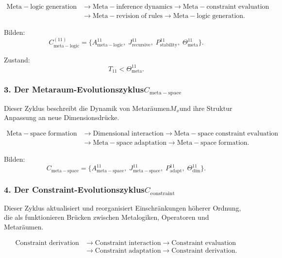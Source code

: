 \[
  \begin{aligned}
  \mathrm{Meta\!-\!logic\;generation}
  &\to \mathrm{Meta\!-\!inference\;dynamics}
  \to \mathrm{Meta\!-\!constraint\;evaluation}\\
  &\to \mathrm{Meta\!-\!revision\;of\;rules}
  \to \mathrm{Meta\!-\!logic\;generation}.
  \end{aligned}
\]

Bilden:
\[
  C_{\mathrm{meta\!-\!logic}}^{(11)}
  =
  \{
    A^{11}_{\mathrm{meta\!-\!logic}},\;
    J^{11}_{\mathrm{recursive}},\;
    P^{11}_{\mathrm{stability}},\;
    \Theta^{11}_{\mathrm{meta}}
  \}.
\]

Zustand:
\[
  T_{11}<\Theta^{11}_{\mathrm{meta}}.
\]


\subsubsection{3. Der Metaraum-Evolutionszyklus$C_{\mathrm{meta\!-\!space}}$}

Dieser Zyklus beschreibt die Dynamik von Metaräumen$M_x$und ihre Struktur
Anpassung an neue Dimensionsdrücke.

\[
  \begin{aligned}
  \mathrm{Meta\!-\!space\;formation}
  &\to \mathrm{Dimensional\;interaction}
  \to \mathrm{Meta\!-\!space\;constraint\;evaluation}\\
  &\to \mathrm{Meta\!-\!space\;adaptation}
  \to \mathrm{Meta\!-\!space\;formation}.
  \end{aligned}
\]

Bilden:
\[
  C_{\mathrm{meta\!-\!space}}
  =
  \{
    A^{11}_{\mathrm{meta\!-\!space}},\;
    J^{11}_{\mathrm{meta\!-\!space}},\;
    P^{11}_{\mathrm{adapt}},\;
    \Theta^{11}_{\mathrm{dim}}
  \}.
\]


\subsubsection{4. Der Constraint-Evolutionszyklus$C_{\mathrm{constraint}}$}

Dieser Zyklus aktualisiert und reorganisiert Einschränkungen höherer Ordnung, die als funktionieren
Brücken zwischen Metalogiken, Operatoren und Metaräumen.

\[
  \begin{aligned}
  \mathrm{Constraint\;derivation}
  &\to \mathrm{Constraint\;interaction}
  \to \mathrm{Constraint\;evaluation}\\
  &\to \mathrm{Constraint\;adaptation}
  \to \mathrm{Constraint\;derivation}.
  \end{aligned}
\]

